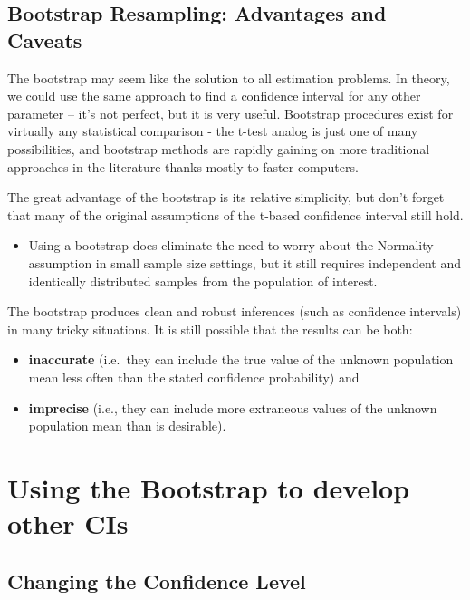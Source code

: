 \documentclass[
]{book}
\providecommand{\tightlist}{%
  \setlength{\itemsep}{0pt}\setlength{\parskip}{0pt}}
\begin{document}
\hypertarget{bootstrap-resampling-advantages-and-caveats}{%
\subsection{Bootstrap Resampling: Advantages and Caveats}\label{bootstrap-resampling-advantages-and-caveats}}

The bootstrap may seem like the solution to all estimation problems. In theory, we could use the same approach to find a confidence interval for any other parameter -- it's not perfect, but it is very useful. Bootstrap procedures exist for virtually any statistical comparison - the t-test analog is just one of many possibilities, and bootstrap methods are rapidly gaining on more traditional approaches in the literature thanks mostly to faster computers.

The great advantage of the bootstrap is its relative simplicity, but don't forget that many of the original assumptions of the t-based confidence interval still hold.

\begin{itemize}
\tightlist
\item
  Using a bootstrap does eliminate the need to worry about the Normality assumption in small sample size settings, but it still requires independent and identically distributed samples from the population of interest.
\end{itemize}

The bootstrap produces clean and robust inferences (such as confidence intervals) in many tricky situations. It is still possible that the results can be both:

\begin{itemize}
\tightlist
\item
  \textbf{inaccurate} (i.e.~they can include the true value of the unknown population mean less often than the stated confidence probability) and
\item
  \textbf{imprecise} (i.e., they can include more extraneous values of the unknown population mean than is desirable).
\end{itemize}

\hypertarget{using-the-bootstrap-to-develop-other-cis}{%
\section{Using the Bootstrap to develop other CIs}\label{using-the-bootstrap-to-develop-other-cis}}

\hypertarget{changing-the-confidence-level}{%
\subsection{Changing the Confidence Level}\label{changing-the-confidence-level}}
\end{document}
